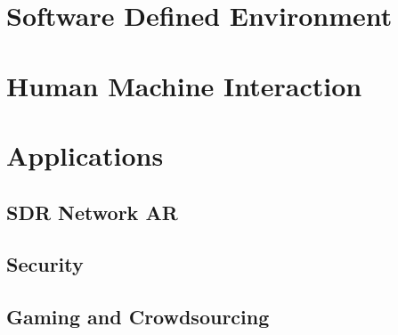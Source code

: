
\section{Software Defined Environment}


\section{Human Machine Interaction}


\section{Applications}

\subsection{SDR Network AR}

\subsection{Security}

\subsection{Gaming and Crowdsourcing}

